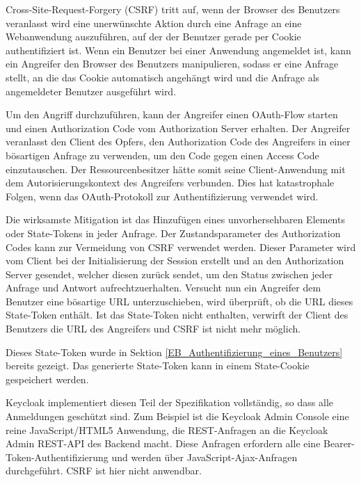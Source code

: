 
Cross-Site-Request-Forgery (CSRF) tritt auf, wenn der Browser des Benutzers veranlasst wird eine unerwünschte Aktion durch eine Anfrage an eine Webanwendung auszuführen, auf der der Benutzer gerade per Cookie authentifiziert ist. Wenn ein Benutzer bei einer Anwendung angemeldet ist, kann ein Angreifer den Browser des Benutzers manipulieren, sodass er eine Anfrage stellt, an die das Cookie automatisch angehängt wird und die Anfrage als angemeldeter Benutzer ausgeführt wird. 

Um den Angriff durchzuführen, kann der Angreifer einen OAuth-Flow starten und einen Authorization Code vom Authorization Server erhalten. Der Angreifer veranlasst den Client des Opfers, den Authorization Code des Angreifers in einer bösartigen Anfrage zu verwenden, um den Code gegen einen Access Code einzutauschen. Der Ressourcenbesitzer hätte somit seine Client-Anwendung mit dem Autorisierungskontext des Angreifers verbunden. Dies hat katastrophale Folgen, wenn das OAuth-Protokoll zur Authentifizierung verwendet wird. \cite{SSEB_OAuth2inAction}

Die wirksamste Mitigation ist das Hinzufügen eines unvorhersehbaren Elements oder State-Tokens in jeder Anfrage. Der Zustandsparameter des Authorization Codes kann zur Vermeidung von CSRF verwendet werden. Dieser Parameter wird vom Client bei der Initialisierung der Session erstellt und an den Authorization Server gesendet, welcher diesen zurück sendet, um den Status zwischen jeder Anfrage und Antwort aufrechtzuerhalten. Versucht nun ein Angreifer dem Benutzer eine bösartige URL unterzuschieben, wird überprüft, ob die URL dieses State-Token enthält. Ist das State-Token nicht enthalten, verwirft der Client des Benutzers die URL des Angreifers und CSRF ist nicht mehr möglich. \cite{SSEB_OAuth2inAction}

Dieses State-Token wurde in Sektion \ref{EB_Authentifizierung_eines_Benutzers} bereits gezeigt. Das generierte State-Token kann in einem State-Cookie gespeichert werden.

Keycloak implementiert diesen Teil der Spezifikation vollständig, so dass alle Anmeldungen geschützt sind. Zum Beispiel ist die Keycloak Admin Console eine reine JavaScript/HTML5 Anwendung, die REST-Anfragen an die Keycloak Admin REST-API des Backend macht. Diese Anfragen erfordern alle eine Bearer-Token-Authentifizierung und werden über JavaScript-Ajax-Anfragen durchgeführt. CSRF ist hier nicht anwendbar. \cite{SSEB_keycloakDocs}

